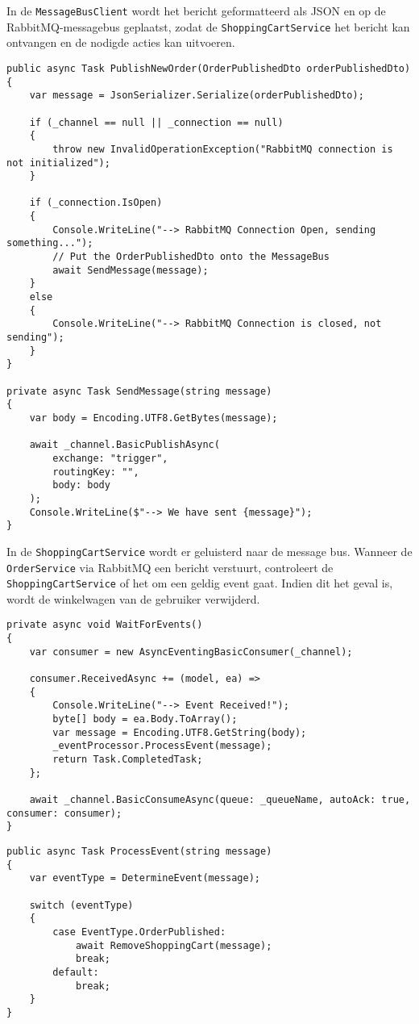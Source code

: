 In de \texttt{MessageBusClient} wordt het bericht geformatteerd als JSON en op de RabbitMQ-messagebus geplaatst, zodat de \texttt{ShoppingCartService} het bericht kan ontvangen en de nodigde acties kan uitvoeren.\medskip

\begin{lstlisting}[style=mystyleA, caption=MessageBusClient.cs (fragment) (Microservice), label=lst:MicroMessageBusCl]
public async Task PublishNewOrder(OrderPublishedDto orderPublishedDto)
{
	var message = JsonSerializer.Serialize(orderPublishedDto);
	
	if (_channel == null || _connection == null)
	{
		throw new InvalidOperationException("RabbitMQ connection is not initialized");
	}
	
	if (_connection.IsOpen)
	{
		Console.WriteLine("--> RabbitMQ Connection Open, sending something...");
		// Put the OrderPublishedDto onto the MessageBus
		await SendMessage(message);
	}
	else
	{
		Console.WriteLine("--> RabbitMQ Connection is closed, not sending");
	}
}

private async Task SendMessage(string message)
{
	var body = Encoding.UTF8.GetBytes(message);
	
	await _channel.BasicPublishAsync(
		exchange: "trigger",
		routingKey: "",
		body: body
	);
	Console.WriteLine($"--> We have sent {message}");
}
\end{lstlisting}

In de \texttt{ShoppingCartService} wordt er geluisterd naar de message bus. Wanneer de \texttt{OrderService} via RabbitMQ een bericht verstuurt, controleert de \texttt{ShoppingCartService} of het om een geldig event gaat. Indien dit het geval is, wordt de winkelwagen van de gebruiker verwijderd.\medskip

\begin{lstlisting}[style=mystyleA, caption=MessageBusSub.cs (fragment) (Microservice), label=lst:MicroMessageBusSb]
private async void WaitForEvents()
{
	var consumer = new AsyncEventingBasicConsumer(_channel);
	
	consumer.ReceivedAsync += (model, ea) =>
	{
		Console.WriteLine("--> Event Received!");
		byte[] body = ea.Body.ToArray();
		var message = Encoding.UTF8.GetString(body);
		_eventProcessor.ProcessEvent(message);
		return Task.CompletedTask;
	};
	
	await _channel.BasicConsumeAsync(queue: _queueName, autoAck: true, consumer: consumer);
}
\end{lstlisting}

\begin{lstlisting}[style=mystyleA, caption=EventProcessor.cs (fragment) (Microservice), label=lst:MicroEventPrc]
public async Task ProcessEvent(string message)
{
	var eventType = DetermineEvent(message);
	
	switch (eventType)
	{
		case EventType.OrderPublished:
			await RemoveShoppingCart(message);
			break;
		default:
			break;
	}
}
\end{lstlisting}

